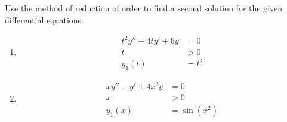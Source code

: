 \documentclass[fleqn, a4paper, 11pt, oneside]{amsart}
\theoremstyle{definition}
\theoremstyle{theorem}
\begin{document}
\begin{question}
	Use the method of reduction of order to find a second solution for the given differential equations.
	\begin{enumerate}
		\item
			\begin{align*}
				t^2 y'' - 4 t y' + 6 y &= 0\\
				t &> 0\\
				y_1(t) &= t^2
			\end{align*}
		\item
			\begin{align*}
				x y'' - y' + 4 x^3 y &= 0\\
				x &> 0\\
				y_1(x) &= \sin(x^2)
			\end{align*}
	\end{enumerate}
\end{question}
\end{document}
